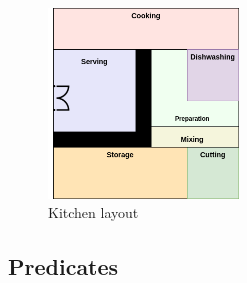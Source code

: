 \documentclass{article}
\begin{document}
\vspace{1em}

\begin{figure}[H]
    \centering
    \includegraphics[width=0.45\textwidth]{illustrations/Kitchen Layout.drawio.png}
    \caption{Kitchen layout}
    \label{fig:kitchen}
\end{figure}
\newpage
\subsection{Predicates}\label{sec:pred}
\end{document}
